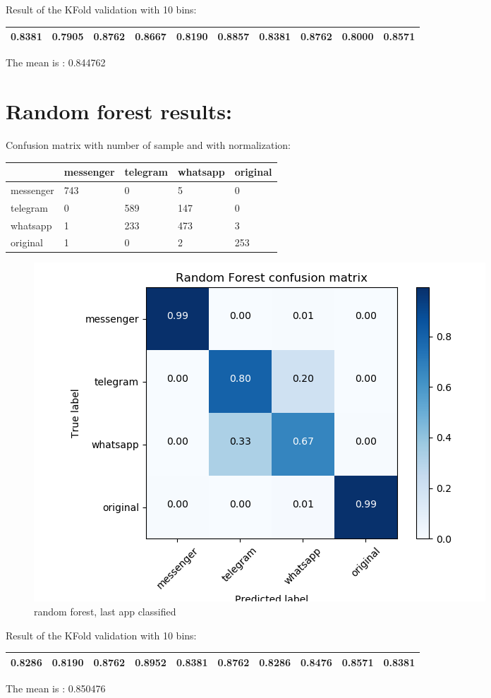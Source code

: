 Result of the KFold validation with 10 bins:
 {\def\arraystretch{1.3} 
 \begin{table}[H] 
\centering 
\begin{tabular}{|l |l |l |l |l |l |l |l |l |l |}  
\hline 
0.8381&
0.7905&
0.8762&
0.8667&
0.8190&
0.8857&
0.8381&
0.8762&
0.8000&
0.8571\\ \hline  

\end{tabular} 
\end{table} }

The mean is : 0.844762\section{Random forest results:} 
Confusion matrix with number of sample and with normalization:
 {\def\arraystretch{1.3} 
 \begin{table}[H] 
\centering 
\begin{tabular}{|l|l|l|l|l|} 
\hline 
  &messenger  &telegram  &whatsapp  &original  \\ \hline
messenger  &743  &0  &5  &0  \\ \hline
telegram  &0  &589  &147  &0  \\ \hline
whatsapp  &1  &233  &473  &3  \\ \hline
original  &1  &0  &2  &253  \\ \hline
\end{tabular} 
\end{table} }

 \begin{figure}[H] 
\centering 
\includegraphics[scale=.6]{images/rf_initial_double_simple.png} 
\caption{random forest, last app classified} 
\end{figure} 


Result of the KFold validation with 10 bins:
 {\def\arraystretch{1.3} 
 \begin{table}[H] 
\centering 
\begin{tabular}{|l |l |l |l |l |l |l |l |l |l |}  
\hline 
0.8286&
0.8190&
0.8762&
0.8952&
0.8381&
0.8762&
0.8286&
0.8476&
0.8571&
0.8381\\ \hline  

\end{tabular} 
\end{table} }

The mean is : 0.850476